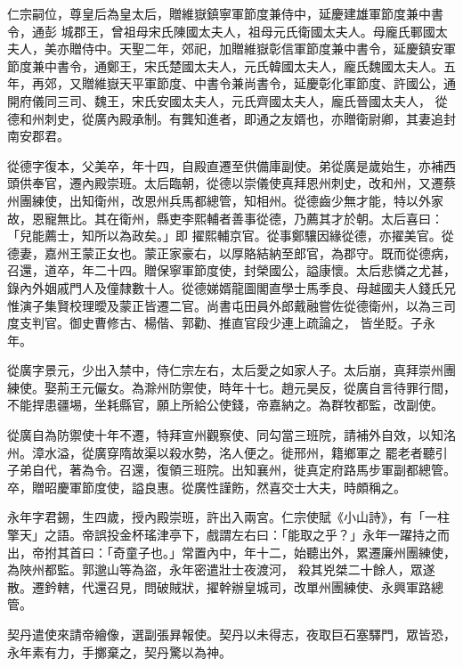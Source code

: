 \begin{pinyinscope}
 仁宗嗣位，尊皇后為皇太后，贈維嶽鎮寧軍節度兼侍中，延慶建雄軍節度兼中書令，通彭
 城郡王，曾祖母宋氏陳國太夫人，祖母元氏衛國太夫人。母龐氏鄆國太夫人，美亦贈侍中。天聖二年，郊祀，加贈維嶽彰信軍節度兼中書令，延慶鎮安軍節度兼中書令，通鄭王，宋氏楚國太夫人，元氏韓國太夫人，龐氏魏國太夫人。五年，再郊，又贈維嶽天平軍節度、中書令兼尚書令，延慶彰化軍節度、許國公，通開府儀同三司、魏王，宋氏安國太夫人，元氏齊國太夫人，龐氏晉國太夫人，
 從德和州刺史，從廣內殿承制。有龔知進者，即通之友婿也，亦贈衛尉卿，其妻追封南安郡君。



 從德字復本，父美卒，年十四，自殿直遷至供備庫副使。弟從廣是歲始生，亦補西頭供奉官，遷內殿崇班。太后臨朝，從德以崇儀使真拜恩州刺史，改和州，又遷蔡州團練使，出知衛州，改恩州兵馬都總管，知相州。從德齒少無才能，特以外家故，恩寵無比。其在衛州，縣吏李熙輔者善事從德，乃薦其才於朝。太后喜曰：「兒能薦士，知所以為政矣。」即
 擢熙輔京官。從事鄭驤因緣從德，亦擢美官。從德妻，嘉州王蒙正女也。蒙正家豪右，以厚賂結納至郎官，為郡守。既而從德病，召還，道卒，年二十四。贈保寧軍節度使，封榮國公，謚康懷。太后悲憐之尤甚，錄內外姻戚門人及僮隸數十人。從德娣婿龍圖閣直學士馬季良、母越國夫人錢氏兄惟演子集賢校理曖及蒙正皆遷二官。尚書屯田員外郎戴融嘗佐從德衛州，以為三司度支判官。御史曹修古、楊偕、郭勸、推直官段少連上疏論之，
 皆坐貶。子永年。



 從廣字景元，少出入禁中，侍仁宗左右，太后愛之如家人子。太后崩，真拜崇州團練使。娶荊王元儼女。為滁州防禦使，時年十七。趙元昊反，從廣自言待罪行間，不能捍患疆埸，坐耗縣官，願上所給公使錢，帝嘉納之。為群牧都監，改副使。



 從廣自為防禦使十年不遷，特拜宣州觀察使、同勾當三班院，請補外自效，以知洺州。漳水溢，從廣穿隋故渠以殺水勢，洺人便之。徙邢州，籍鄉軍之
 罷老者聽引子弟自代，著為令。召還，復領三班院。出知襄州，徙真定府路馬步軍副都總管。卒，贈昭慶軍節度使，謚良惠。從廣性謹飭，然喜交士大夫，時頗稱之。



 永年字君錫，生四歲，授內殿崇班，許出入兩宮。仁宗使賦《小山詩》，有「一柱擎天」之語。帝誤投金杯瑤津亭下，戲謂左右曰：「能取之乎？」永年一躍持之而出，帝拊其首曰：「奇童子也。」常置內中，年十二，始聽出外，累遷廉州團練使，為陜州都監。郭邈山等為盜，永年密遣壯士夜渡河，
 殺其兇桀二十餘人，眾遂散。遷鈐轄，代還召見，問破賊狀，擢幹辦皇城司，改單州團練使、永興軍路總管。



 契丹遣使來請帝繪像，選副張昪報使。契丹以未得志，夜取巨石塞驛門，眾皆恐，永年素有力，手擲棄之，契丹驚以為神。




\end{pinyinscope}
